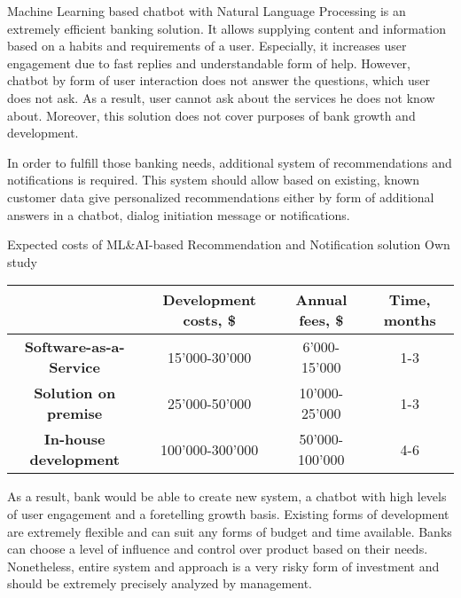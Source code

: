 Machine Learning based chatbot with Natural Language Processing is an extremely efficient banking solution.
It allows supplying content and information based on a habits and requirements of a user.
Especially, it increases user engagement due to fast replies and understandable form of help.
However, chatbot by form of user interaction does not answer the questions, which user does not ask.
As a result, user cannot ask about the services he does not know about.
Moreover, this solution does not cover purposes of bank growth and development.

In order to fulfill those banking needs, additional system of recommendations and notifications is required.
This system should allow based on existing, known customer data give personalized recommendations either by form of additional answers in a chatbot, dialog initiation message or notifications.

\mttable
{Expected costs of ML\&AI-based Recommendation and Notification solution}
{Own study}
{
    \begin{tabular}{| c | c | c | c |}
        \hline
        &
        \textbf{Development costs, \$} & 
        \textbf{Annual fees, \$} &
        \textbf{Time, months} \\ \hline 
       
        \textbf{Software-as-a-Service} & 
            15'000-30'000 & 
            6'000-15'000 &
            1-3 \\ \hline 
       
        \textbf{Solution on premise} & 
            25'000-50'000 &
            10'000-25'000 &
            1-3 \\ \hline 
            
        \textbf{In-house development} &
            100'000-300'000 &
            50'000-100'000 &
            4-6 \\ \hline
    \end{tabular}
}

As a result, bank would be able to create new system, a chatbot with high levels of user engagement and a foretelling growth basis.
Existing forms of development are extremely flexible and can suit any forms of budget and time available.
Banks can choose a level of influence and control over product based on their needs.
Nonetheless, entire system and approach is a very risky form of investment and should be extremely precisely analyzed by management.

